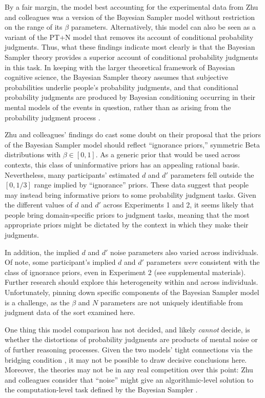 \documentclass[
  english,
  man,floatsintext]{apa6}
\begin{document}
By a fair margin, the model best accounting for the experimental data from Zhu and colleagues \autocite*{zhu.etal2020} was a version of the Bayesian Sampler model without restriction on the range of its \(\beta\) parameters. Alternatively, this model can also be seen as a variant of the PT+N model that removes its account of conditional probability judgments. Thus, what these findings indicate most clearly is that the Bayesian Sampler theory provides a superior account of conditional probability judgments in this task. In keeping with the larger theoretical framework of Bayesian cognitive science, the Bayesian Sampler theory assumes that subjective probabilities underlie people's probability judgments, and that conditional probability judgments are produced by Bayesian conditioning occurring in their mental models of the events in question, rather than as arising from the probability judgment process \autocite{chater.etal2020,zhu.etal2020}.

Zhu and colleagues' findings do cast some doubt on their proposal that the priors of the Bayesian Sampler model should reflect ``ignorance priors,'' symmetric Beta distributions with \(\beta \in [0, 1]\). As a generic prior that would be used across contexts, this class of uninformative priors has an appealing rational basis. Nevertheless, many participants' estimated \(d\) and \(d'\) parameters fell outside the \([0, 1/3]\) range implied by ``ignorance'' priors. These data suggest that people may instead bring informative priors to some probability judgment tasks. Given the different values of \(d\) and \(d'\) across Experiments 1 and 2, it seems likely that people bring domain-specific priors to judgment tasks, meaning that the most appropriate priors might be dictated by the context in which they make their judgments.

In addition, the implied \(d\) and \(d'\) noise parameters also varied across individuals. Of note, some participant's implied \(d\) and \(d'\) parameters \emph{were} consistent with the class of ignorance priors, even in Experiment 2 (see supplemental materials). Further research should explore this heterogeneity within and across individuals. Unfortunately, pinning down specific components of the Bayesian Sampler model is a challenge, as the \(\beta\) and \(N\) parameters are not uniquely identifiable from judgment data of the sort examined here.

One thing this model comparison has not decided, and likely \emph{cannot} decide, is whether the distortions of probability judgments are products of mental noise or of further reasoning processes. Given the two models' tight connections via the bridging condition \autocite{zhu.etal2020}, it may not be possible to draw decisive conclusions here. Moreover, the theories may not be in any real competition over this point: Zhu and colleagues consider that ``noise'' might give an algorithmic-level solution to the computation-level task defined by the Bayesian Sampler \autocite*{zhu.etal2020}.
\end{document}
